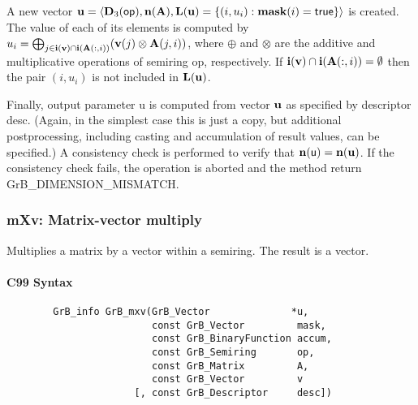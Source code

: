 A new vector ${\bf u} = \langle \bold{D}_3({\sf op}),
\bold{n}({\bf A}), \bold{L}({\bf u}) = \{(i,u_i) : {\bf mask}(i)
= {\sf true} \} \rangle$ is created.  The value of each of its elements
is computed by $u_i = \bigoplus_{j \in {\bf i}({\bf v}) \cap
{\bf i}({\bf A}(:,i))} ({\bf v}(j) \otimes {\bf A}(j,i))$,
where $\oplus$ and $\otimes$ are the additive and multiplicative
operations of semiring {\sf op}, respectively.  If ${\bf i}({\bf v})
\cap {\bf i}({\bf A}(:,i)) = \emptyset$ then the pair $(i,u_i)$
is not included in $\bold{L}({\bf u})$.

Finally, output parameter {\sf u} is computed from vector ${\bf u}$
as specified by descriptor {\sf desc}. (Again, in the simplest case this
is just a copy, but additional postprocessing, including casting and
accumulation of result values, can be specified.)  A consistency check is
performed to verify that $\bold{n}({\sf u}) = \bold{n}({\bf u})$. If
the consistency check fails, the operation is aborted and the method
return {\sf GrB\_DIMENSION\_MISMATCH}.

 


\subsubsection{{\sf mXv}: Matrix-vector multiply}

Multiplies a matrix by a vector within a semiring. The result is a vector.

\paragraph{C99 Syntax}

\begin{verbatim}
        GrB_info GrB_mxv(GrB_Vector              *u,
                         const GrB_Vector         mask,
                         const GrB_BinaryFunction accum,
                         const GrB_Semiring       op, 
                         const GrB_Matrix         A,
                         const GrB_Vector         v
                      [, const GrB_Descriptor     desc])
\end{verbatim}

